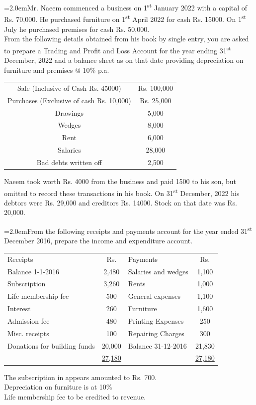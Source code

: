 \documentclass[11pt,a4paper]{article}
\newcommand{\lqn}[2]{\Needspace{6\baselineskip}\par\medskip\noindent\hangindent=2.0em\hangafter=1\makebox[2.0em][l]{\textbf{#1.}}#2\par}
\begin{document}
\lqn{16}{Mr. Naeem commenced a business on 1\textsuperscript{st}  January 2022 with a capital of Rs. 70,000. He purchased furniture on 1\textsuperscript{st}  April 2022 for cash Rs. 15000. On 1\textsuperscript{st}  July he purchased premises for cash Rs. 50,000.\\
From the following details obtained from his book by single entry, you are asked to prepare a Trading and Profit and Loss Account for the year ending 31\textsuperscript{st}  December, 2022 and a balance sheet as on that date providing depreciation on furniture and premises @ 10\% p.a.\par
\par\smallskip\noindent\hspace*{1.2em}\begin{tabular}{|cc|}
\hline
Sale (Inclusive of Cash Rs. 45000) & Rs. 100,000 \\
Purchases (Exclusive of cash Rs. 10,000) & Rs. 25,000 \\
Drawings & 5,000 \\
Wedges & 8,000 \\
Rent & 6,000 \\
Salaries & 28,000 \\
Bad debts written off & 2,500 \\
\hline
\end{tabular}\par\smallskip
Naeem took worth Rs. 4000 from the business and paid 1500 to his son, but omitted to record these transactions in his book. On 31\textsuperscript{st}  December, 2022 his debtors were Rs. 29,000 and creditors Rs. 14000. Stock on that date was Rs. 20,000.\par
}
\lqn{17}{From the following receipts and payments account for the year ended 31\textsuperscript{st}  December 2016, prepare the income and expenditure account.\par
\par\smallskip\noindent\hspace*{1.2em}\begin{tabular}{|lclc|}
\hline
Receipts & Rs. & Payments & Rs. \\
Balance 1-1-2016 & 2,480 & Salaries and wedges & 1,100 \\
Subscription & 3,260 & Rents & 1,000 \\
Life membership fee & 500 & General expenses & 1,100 \\
Interest & 260 & Furniture & 1,600 \\
Admission fee & 480 & Printing Expenses & 250 \\
Misc. receipts & 100 & Repairing Charges & 300 \\
Donations for building funds & 20,000 & Balance 31-12-2016 & 21,830 \\
 & \underline{27,180} &  & \underline{27,180} \\
\hline
\end{tabular}\par\smallskip
The subscription in appears amounted to Rs. 700.\\
Depreciation on furniture is at 10\%\\
Life membership fee to be credited to revenue.\par
}
\end{document}
